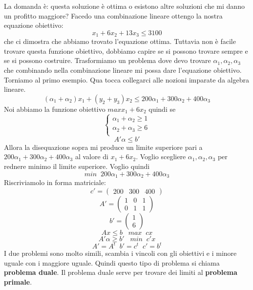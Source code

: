 \documentclass[a4paper]{article}
\begin{document}
La domanda è: questa soluzione è ottima o esistono altre soluzioni che mi danno un profitto maggiore?
Facedo una combinazione lineare ottengo la nostra equazione obiettivo:
\[x_1 + 6x_2 + 13x_3 \le 3100\]
che ci dimostra che abbiamo trovato l'equazione ottima.
Tuttavia non è facile trovare questa funzione obiettivo, dobbiamo capire se si possono trovare sempre e se si possono costruire. 
Trasformiamo un problema dove devo trovare $\alpha_1, \alpha_2, \alpha_3$ che combinando nella combinazione lineare mi possa dare l'equazione obiettivo.
Torniamo al primo esempio. Qua tocca collegarci alle nozioni imparate da algebra lineare.
\[(\alpha_1 + \alpha_2)x_1 + (y_2 + y_3)x_2 \le 200\alpha_1 + 300\alpha_2 + 400\alpha_3\]
Noi abbiamo la funzione obiettivo $max x_1 + 6x_2$ quindi se 
\[
\begin{cases}
  \alpha_1 + \alpha_2 \ge 1\\
  \alpha_2 + \alpha_3 \ge 6\\
\end{cases}
\]
\[
A'\alpha \le b'
\]
Allora la disequazione sopra mi produce un limite superiore pari a $200\alpha_1 + 300\alpha_2 + 400\alpha_3$ al valore di $x_1 + 6x_2$.
Voglio scegliere $\alpha_1, \alpha_2, \alpha_3$ per rednere minimo il limite superiore.
Voglio quindi 
\[min \; \; 200\alpha_1 + 300\alpha_2 + 400\alpha_3\]
Riscriviamolo in forma matriciale:
\[
c' = \begin{pmatrix}
  200 & 300 & 400
\end{pmatrix}
\] 
\[A' = \begin{pmatrix}
  1 & 0 & 1\\
  0 & 1 & 1
\end{pmatrix}\]
\[b' = \begin{pmatrix}
  1\\
  6
\end{pmatrix}\]
\[Ax \le b \; \; \; max \; \; cx\]
\[A'\alpha \ge b' \; \; \; min \; \; c'x\]
\[A' = A^t \; \; b' = c^t \; \; c' = b^t\]
I due problemi sono molto simili, scambia i vincoli con gli obiettivi e i minore uguale con i maggiore uguale.
Quindi questo tipo di problema si chiama \textbf{problema duale}. Il problema duale serve per trovare dei limiti al \textbf{problema primale}.
\end{document}
